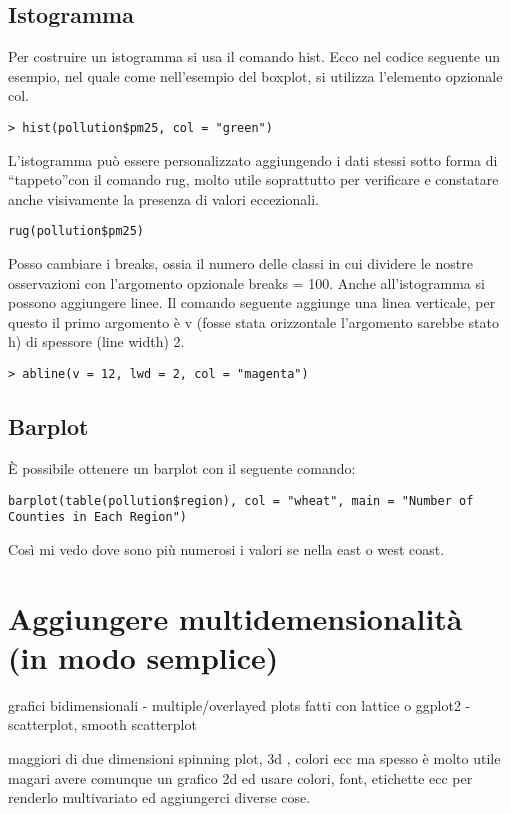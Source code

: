 \subsection{Istogramma}
Per costruire un istogramma si usa il comando \textsf{hist}. Ecco nel codice seguente un esempio, nel quale come nell'esempio del boxplot, si utilizza l'elemento opzionale col.
\begin{lstlisting}
> hist(pollution$pm25, col = "green")
\end{lstlisting}
L'istogramma può essere personalizzato aggiungendo i dati stessi sotto forma di ``tappeto''con il comando \textsf{rug}, molto utile soprattutto per verificare e constatare anche visivamente la presenza di valori eccezionali.
\begin{lstlisting}
rug(pollution$pm25)
\end{lstlisting} 
Posso cambiare i breaks, ossia il numero delle classi in cui dividere le nostre osservazioni con l'argomento opzionale \textsf{breaks = 100}.
Anche all'istogramma si possono aggiungere linee. Il comando seguente aggiunge una linea verticale, per questo il primo argomento è v (fosse stata orizzontale l'argomento sarebbe stato h) di spessore (line width) 2.
\begin{lstlisting}
> abline(v = 12, lwd = 2, col = "magenta")
\end{lstlisting} 

\subsection{Barplot}
È possibile ottenere un barplot con il seguente comando:
\begin{lstlisting}
barplot(table(pollution$region), col = "wheat", main = "Number of Counties in Each Region")
\end{lstlisting} 
Così mi vedo dove sono più numerosi i valori se nella east o west coast.

\section{Aggiungere multidemensionalità (in modo semplice)}


grafici bidimensionali
- multiple/overlayed plots fatti con lattice o ggplot2
- scatterplot, smooth scatterplot

maggiori di due dimensioni
spinning plot, 3d , colori ecc ma spesso è molto utile magari avere comunque un grafico 2d ed usare colori, font, etichette ecc per renderlo multivariato ed aggiungerci diverse cose.

